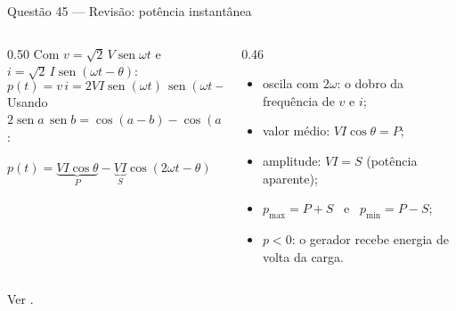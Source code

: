 \documentclass[aspectratio=169,11pt]{beamer}
\providecommand{\sen}{\operatorname{sen}}   %
\begin{document}
\begin{frame}{Questão 45 --- Revisão: potência instantânea}
  \small
  \begin{columns}[T]
    \begin{column}{0.50\textwidth}
      Com $v = \sqrt{2}\,V\sen\omega t$ e $i = \sqrt{2}\,I\sen(\omega t -
      \theta)$:
      \[
        p(t) = v\,i = 2VI\sen(\omega t)\,\sen(\omega t - \theta)
      \]
      Usando $2\sen a\,\sen b = \cos(a-b) - \cos(a+b)$:
      \begin{conceito}[left=3pt,right=3pt]
        \centering
        $p(t) = {\underbrace{VI\cos\theta}_{P}}
              - {\underbrace{VI}_{S}}\cos(2\omega t - \theta)$
      \end{conceito}
    \end{column}
    \begin{column}{0.46\textwidth}
      \pause
      \begin{itemize}
        \item oscila com $2\omega$: o dobro da frequência de $v$ e $i$;
        \item valor médio: $VI\cos\theta = P$;
        \item amplitude: $VI = S$ (potência aparente);
        \item $p_{\max} = P + S$ \ e \ $p_{\min} = P - S$;
        \item $p < 0$: o gerador recebe energia de volta da carga.
      \end{itemize}
    \end{column}
  \end{columns}
  \vfill
  {\footnotesize\color{Mute} Ver \cite{stevenson1986elementos}.}
\end{frame}
\end{document}
